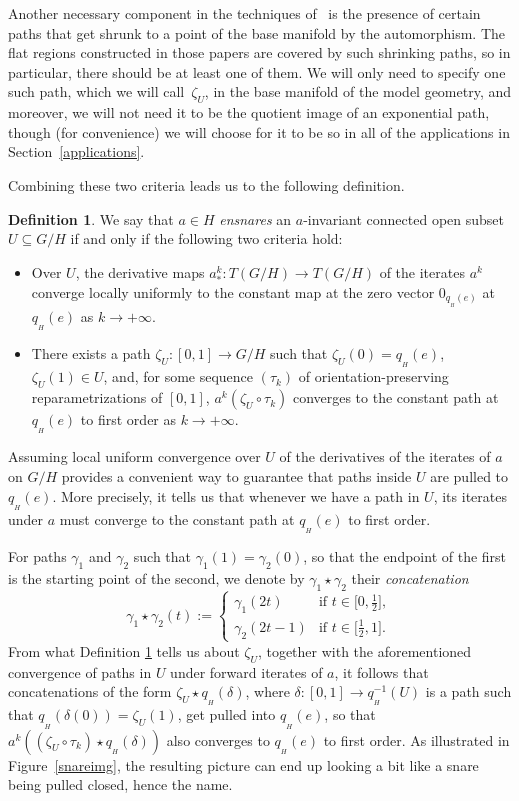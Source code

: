 \documentclass[10pt,a4paper]{amsart}
\numberwithin{equation}{section}
\theoremstyle{definition}
\newtheorem{Definition}[Theorem]{Definition}
\begin{document}
Another necessary component in the techniques of~\cite{CapMelnick2013,MelnickNeusser2016} is the presence of certain paths that get shrunk to a point of the base manifold by the automorphism. The flat regions constructed in those papers are covered by such shrinking paths, so in particular, there should be at least one of them. We will only need to specify one such path, which we will call~$\zeta_U$, in the base manifold of the model geometry, and moreover, we will not need it to be the quotient image of an exponential path, though (for convenience) we will choose for it to be so in all of the applications in Section~\ref{applications}.

Combining these two criteria leads us to the following definition.

\begin{Definition}\label{ensnaredef} We say that $a\in H$ \emph{ensnares} an $a$-invariant connected open subset $U\subseteq G/H$ if and only if the following two criteria hold:
\begin{itemize}\itemsep=0pt
\item Over $U$, the derivative maps $a^k_*\colon T(G/H)\to T(G/H)$ of the iterates $a^k$ converge locally uniformly to the constant map at the zero vector $0_{q_{{}_H}(e)}$ at $q_{{}_H}(e)$ as $k\rightarrow+\infty$.
\item There exists a path $\zeta_U\colon [0,1]\to G/H$ such that $\zeta_U(0)=q_{{}_H}(e)$, $\zeta_U(1)\in U$, and, for some sequence $(\tau_k)$ of orientation-preserving reparametrizations of $[0,1]$, $a^k(\zeta_U\circ\tau_k)$ converges to the constant path at $q_{{}_H}(e)$ to first order as $k\rightarrow+\infty$.
\end{itemize}\end{Definition}

Assuming local uniform convergence over $U$ of the derivatives of the iterates of $a$ on $G/H$ provides a convenient way to guarantee that paths inside $U$ are pulled to $q_{{}_H}(e)$. More precisely, it tells us that whenever we have a path in $U$, its iterates under $a$ must converge to the constant path at $q_{{}_H}(e)$ to first order.

For paths $\gamma_1$ and $\gamma_2$ such that $\gamma_1(1)=\gamma_2(0)$, so that the endpoint of the first is the starting point of the second, we denote by $\gamma_1\star\gamma_2$ their \emph{concatenation}
\[\gamma_1\star\gamma_2(t):= \begin{cases}\gamma_1(2t) & \text{if }t\in\bigl[0,\tfrac{1}{2}\bigr], \\
\gamma_2(2t-1) & \text{if }t\in\bigl[\tfrac{1}{2},1\bigr].\end{cases}
\]
From what Definition \ref{ensnaredef} tells us about $\zeta_U$, together with the aforementioned convergence of paths in $U$ under forward iterates of $a$, it follows that concatenations of the form $\zeta_U\star q_{{}_H}(\delta)$, where $\delta\colon [0,1]\to q_{{}_H}^{-1}(U)$ is a path such that $q_{{}_H}(\delta(0))=\zeta_U(1)$, get pulled into $q_{{}_H}(e)$, so that $a^k((\zeta_U\circ\tau_k)\star q_{{}_H}(\delta))$ also converges to $q_{{}_H}(e)$ to first order. As illustrated in Figure~\ref{snareimg}, the resulting picture can end up looking a bit like a snare being pulled closed, hence the name.
\end{document}
